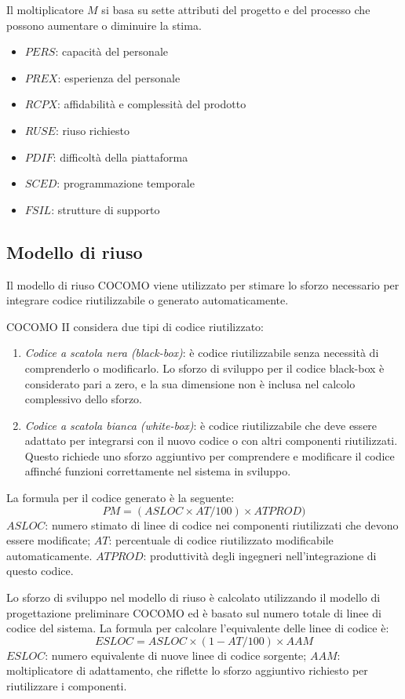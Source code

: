 Il moltiplicatore $M$ si basa su sette attributi del progetto e del processo che possono aumentare o diminuire la stima.
\begin{itemize}
    \item $PERS$: capacità del personale
    \item $PREX$: esperienza del personale
    \item $RCPX$: affidabilità e complessità del prodotto
    \item $RUSE$: riuso richiesto
    \item $PDIF$: difficoltà della piattaforma
    \item $SCED$: programmazione temporale
    \item $FSIL$: strutture di supporto
\end{itemize}

\subsection{Modello di riuso}
Il modello di riuso COCOMO viene utilizzato per stimare lo sforzo necessario per integrare codice riutilizzabile o generato automaticamente.

COCOMO II considera due tipi di codice riutilizzato:
\begin{enumerate}
    \item \textit{Codice a scatola nera (black-box)}: è codice riutilizzabile senza necessità di comprenderlo o modificarlo. Lo sforzo di sviluppo per il codice black-box è considerato pari a zero, e la sua dimensione non è inclusa nel calcolo complessivo dello sforzo.
    \item \textit{Codice a scatola bianca (white-box)}: è codice riutilizzabile che deve essere adattato per integrarsi con il nuovo codice o con altri componenti riutilizzati. Questo richiede uno sforzo aggiuntivo per comprendere e modificare il codice affinché funzioni correttamente nel sistema in sviluppo.
\end{enumerate}
La formula per il codice generato è la seguente:
\begin{equation*}
    PM=(ASLOC\times AT/100)\times ATPROD)    
\end{equation*}
$ASLOC$: numero stimato di linee di codice nei componenti riutilizzati che devono essere modificate; $AT$: percentuale di codice riutilizzato modificabile automaticamente. $ATPROD$: produttività degli ingegneri nell'integrazione di questo codice.

Lo sforzo di sviluppo nel modello di riuso è calcolato utilizzando il modello di progettazione preliminare COCOMO ed è basato sul numero totale di linee di codice del sistema. La formula per calcolare l'equivalente delle linee di codice è:
\begin{equation*}
    ESLOC = ASLOC\times (1-AT/100)\times AAM
\end{equation*}
$ESLOC$: numero equivalente di nuove linee di codice sorgente; $AAM$: moltiplicatore di adattamento, che riflette lo sforzo aggiuntivo richiesto per riutilizzare i componenti.

